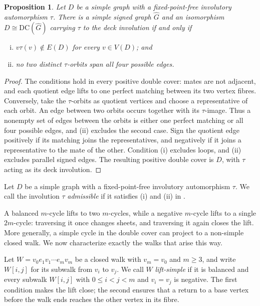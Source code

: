 \documentclass{article}
\newcommand{\DC}{\mathrm{DC}}
\newtheorem{proposition}[theorem]{Proposition}
\theoremstyle{definition}
\theoremstyle{remark}
\begin{document}
\begin{proposition}\label{prop:admissible-involution}
Let $D$ be a simple graph with a fixed-point-free involutory automorphism
$\tau$.  There is a simple signed graph $\widehat G$ and an isomorphism
$D\cong\DC(\widehat G)$ carrying $\tau$ to the deck involution if and only
if
\begin{enumerate}[(i)]
\item $v\tau(v)\notin E(D)$ for every $v\in V(D)$; and
\item no two distinct $\tau$-orbits span all four possible edges.
\end{enumerate}

\end{proposition}
\begin{proof}
The conditions hold in every positive double cover: mates are not adjacent,
and each quotient edge lifts to one perfect matching between its two vertex
fibres.  Conversely, take the $\tau$-orbits as quotient vertices and choose
a representative of each orbit.  An edge between two orbits occurs together
with its $\tau$-image.  Thus a nonempty set of edges between the orbits is
either one perfect matching or all four possible edges, and (ii) excludes
the second case.  Sign the quotient edge positively if its matching joins
the representatives, and negatively if it joins a representative to the
mate of the other.  Condition (i) excludes loops, and (ii) excludes parallel
signed edges.  The resulting positive double cover is $D$, with $\tau$
acting as its deck involution.
\end{proof}

Let $D$ be a simple graph with a fixed-point-free involutory automorphism
$\tau$. We call the involution  $\tau$ \emph{admissible} if it satisfies (i) and (ii) in .



A balanced $m$-cycle lifts to two $m$-cycles, while a negative $m$-cycle
lifts to a single $2m$-cycle: traversing it once changes sheets, and
traversing it again closes the lift.  More generally, a simple cycle in
the double cover can project to a non-simple closed walk.  We now characterize
exactly the walks that arise this way.

Let $W=v_0e_1v_1\cdots e_mv_m$ be a closed walk with $v_m=v_0$ and
$m\geq3$, and write $W[i,j]$ for its subwalk from $v_i$ to $v_j$.  We call
$W$ \emph{lift-simple} if it is balanced and every subwalk $W[i,j]$ with
$0\leq i<j<m$ and $v_i=v_j$ is negative.  The first condition makes the
lift close; the second ensures that a return to a base vertex before the
walk ends reaches the other vertex in its fibre.
\end{document}
